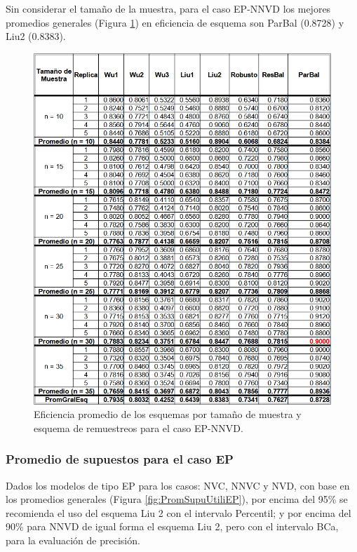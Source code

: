 Sin considerar el tamaño de la muestra, para el caso EP-NNVD los mejores promedios generales (Figura \ref{fig:EficPromEsqTamMuesEsqRemuEP-NNVD}) en eficiencia de esquema son ParBal (0.8728) y Liu2 (0.8383).


\begin{figure}[ht] 
	\centering 
	\includegraphics[width=0.70\linewidth]{img/EP_NNVD_Efic_Esq.png} 
	\caption{Eficiencia promedio de los esquemas por tamaño de muestra y esquema de remuestreos para el caso EP-NNVD.} 
	\label{fig:EficPromEsqTamMuesEsqRemuEP-NNVD}
\end{figure}
\FloatBarrier



\subsubsection{Promedio de supuestos para el caso EP}
Dados los modelos de tipo EP para los casos: NVC, NNVC y NVD, con base en los promedios generales (Figura \ref{fig:PromSupuUtiliEP}), por encima del 95\% se recomienda el uso del esquema Liu 2 con el intervalo Percentil; y por encima del 90\% para NNVD de igual forma el esquema Liu 2, pero con el intervalo BCa, para la evaluación de precisión.


